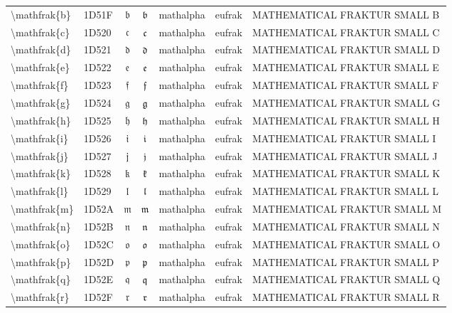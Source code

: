 \documentclass[a4paper,landscape]{article}
\begin{document}
\begin{longtable}{llcclll}
\textbackslash{}mathfrak\{b\} & 1D51F & 𝔟 & $\mathfrak{b}$ & mathalpha & eufrak & MATHEMATICAL FRAKTUR SMALL B \\
\textbackslash{}mathfrak\{c\} & 1D520 & 𝔠 & $\mathfrak{c}$ & mathalpha & eufrak & MATHEMATICAL FRAKTUR SMALL C \\
\textbackslash{}mathfrak\{d\} & 1D521 & 𝔡 & $\mathfrak{d}$ & mathalpha & eufrak & MATHEMATICAL FRAKTUR SMALL D \\
\textbackslash{}mathfrak\{e\} & 1D522 & 𝔢 & $\mathfrak{e}$ & mathalpha & eufrak & MATHEMATICAL FRAKTUR SMALL E \\
\textbackslash{}mathfrak\{f\} & 1D523 & 𝔣 & $\mathfrak{f}$ & mathalpha & eufrak & MATHEMATICAL FRAKTUR SMALL F \\
\textbackslash{}mathfrak\{g\} & 1D524 & 𝔤 & $\mathfrak{g}$ & mathalpha & eufrak & MATHEMATICAL FRAKTUR SMALL G \\
\textbackslash{}mathfrak\{h\} & 1D525 & 𝔥 & $\mathfrak{h}$ & mathalpha & eufrak & MATHEMATICAL FRAKTUR SMALL H \\
\textbackslash{}mathfrak\{i\} & 1D526 & 𝔦 & $\mathfrak{i}$ & mathalpha & eufrak & MATHEMATICAL FRAKTUR SMALL I \\
\textbackslash{}mathfrak\{j\} & 1D527 & 𝔧 & $\mathfrak{j}$ & mathalpha & eufrak & MATHEMATICAL FRAKTUR SMALL J \\
\textbackslash{}mathfrak\{k\} & 1D528 & 𝔨 & $\mathfrak{k}$ & mathalpha & eufrak & MATHEMATICAL FRAKTUR SMALL K \\
\textbackslash{}mathfrak\{l\} & 1D529 & 𝔩 & $\mathfrak{l}$ & mathalpha & eufrak & MATHEMATICAL FRAKTUR SMALL L \\
\textbackslash{}mathfrak\{m\} & 1D52A & 𝔪 & $\mathfrak{m}$ & mathalpha & eufrak & MATHEMATICAL FRAKTUR SMALL M \\
\textbackslash{}mathfrak\{n\} & 1D52B & 𝔫 & $\mathfrak{n}$ & mathalpha & eufrak & MATHEMATICAL FRAKTUR SMALL N \\
\textbackslash{}mathfrak\{o\} & 1D52C & 𝔬 & $\mathfrak{o}$ & mathalpha & eufrak & MATHEMATICAL FRAKTUR SMALL O \\
\textbackslash{}mathfrak\{p\} & 1D52D & 𝔭 & $\mathfrak{p}$ & mathalpha & eufrak & MATHEMATICAL FRAKTUR SMALL P \\
\textbackslash{}mathfrak\{q\} & 1D52E & 𝔮 & $\mathfrak{q}$ & mathalpha & eufrak & MATHEMATICAL FRAKTUR SMALL Q \\
\textbackslash{}mathfrak\{r\} & 1D52F & 𝔯 & $\mathfrak{r}$ & mathalpha & eufrak & MATHEMATICAL FRAKTUR SMALL R \\

\end{longtable}
\end{document}
